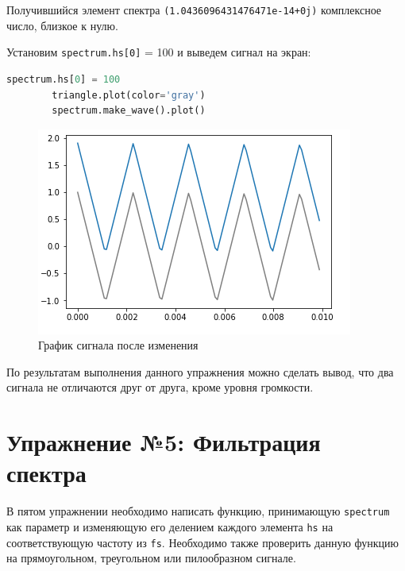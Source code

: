 \documentclass[a4paper, 14pt]{extarticle}
\begin{document}
    Получившийся элемент спектра \texttt{(1.0436096431476471e-14+0j)} комплексное число, близкое к нулю.

    Установим \texttt{spectrum.hs[0]} = 100 и выведем сигнал на экран:

    \begin{lstlisting}[language=Python, caption= Изменение spectrum.hs и вывод сигналов на экран, label={lst:change_spectrum}]
        spectrum.hs[0] = 100
        triangle.plot(color='gray')
        spectrum.make_wave().plot()
    \end{lstlisting}

    \begin{figure}[H]
        \centering
        \includegraphics[width=\textwidth]{triangle_signal_spectr_change}
        \caption{График сигнала после изменения}
        \label{fig:triangle_signal_spectr_change}
    \end{figure}

    По результатам выполнения данного упражнения можно сделать вывод, что два сигнала не отличаются друг от друга, кроме уровня громкости.

    \newpage


    \section{Упражнение №5: Фильтрация спектра}
    \label{sec:5_spectrum_filter}

    В пятом упражнении необходимо написать функцию, принимающую \texttt{spectrum} как параметр и изменяющую его делением каждого элемента \texttt{hs} на соответствующую частоту из \texttt{fs}.
    Необходимо также проверить данную функцию на прямоугольном, треугольном или пилообразном сигнале.
\end{document}
